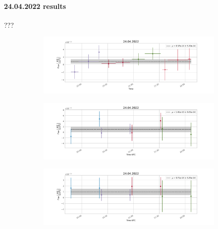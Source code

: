     \paragraph{24.04.2022 results}
    ???
        \begin{figure}[H]
        \centering
        \begin{subfigure}{\textwidth}
            \includegraphics[width=\textwidth]{report/Figures/results/lc_2404.png}
        \end{subfigure}%
        \hspace{1em}
        \begin{subfigure}{\textwidth}
            \centering
            \includegraphics[width=\textwidth]{report/Figures/results/lc_2404_notconst.png}
        \end{subfigure}
        \hspace{1em}
        \begin{subfigure}{\textwidth}
            \centering
            \includegraphics[width=\textwidth]{report/Figures/results/lc_2404_psf_const.png}
        \end{subfigure}
        \caption{}
        \label{24_lc}
        \end{figure}

